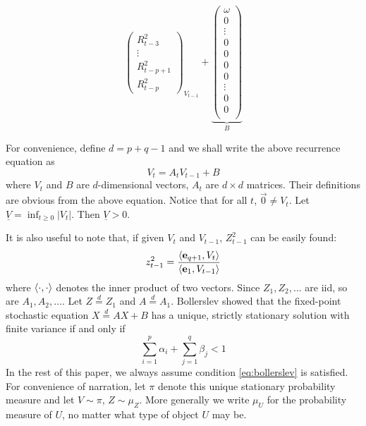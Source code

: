 \documentclass[aoas,preprint]{imsart}
\numberwithin{equation}{section}
\theoremstyle{plain}
\begin{document}
\begin{small}
\begin{equation*}
{\begin{pmatrix}
        R_{t-3}^2 \\
        \vdots \\
        R_{t-p+1}^2 \\
        R_{t-p}^2
      \end{pmatrix}
    }_{V_{t-1}} +
    \underbrace{
      \begin{pmatrix}
        \omega \\
        0 \\
        \vdots \\
        0 \\
        0 \\
        0 \\
        0 \\
        \vdots \\
        0 \\
        0 \\
      \end{pmatrix}
    }_{B}
  \end{equation*}
\end{small}
For convenience, define $d = p + q - 1$ and we shall write the above
recurrence equation as
\begin{equation}
  \label{eq:garchpq_sre}
  V_t = A_t V_{t-1} + B
\end{equation}
where $V_t$ and $B$ are $d$-dimensional vectors, $A_t$ are
$d \times d$ matrices. Their definitions are obvious from the above
equation. Notice that for all $t$, $\vec 0 \neq V_t$. Let
$\underline V = \inf_{t \geq 0} |V_t|$. Then $\underline V > 0$.

It is also useful to note that, if given $V_t$ and $V_{t-1}$,
$Z_{t-1}^2$ can be easily found:
\[
z_{t-1}^2 = {
  \langle\mathbf{e}_{q+1}, V_{t}\rangle
  \over
  \langle\mathbf{e}_1, V_{t-1}\rangle
}
\]
where $\langle\cdot, \cdot\rangle$ denotes the inner product of two vectors.
Since $Z_1, Z_2, \dots$ are iid, so are $A_1, A_2, \dots$.
Let $Z \overset{d}{=} Z_1$ and $A \overset{d}{=} A_1$.
Bollerslev \cite{bollerslev:1986} showed that the fixed-point
stochastic equation $X \overset{d}{=} A X + B$ has a unique, strictly
stationary solution with finite variance if and only if
\begin{equation}
  \sum_{i=1}^p \alpha_i + \sum_{j=1}^q \beta_j < 1
  \label{eq:bollerslev}
\end{equation}
In the rest of this paper, we always assume condition
\eqref{eq:bollerslev} is satisfied. For convenience of narration, let
$\pi$ denote this unique stationary probability measure and let
$V \sim \pi$, $Z \sim \mu_Z$. More generally we write $\mu_U$ for the
probability measure of $U$, no matter what type of object $U$ may be.
\end{document}
